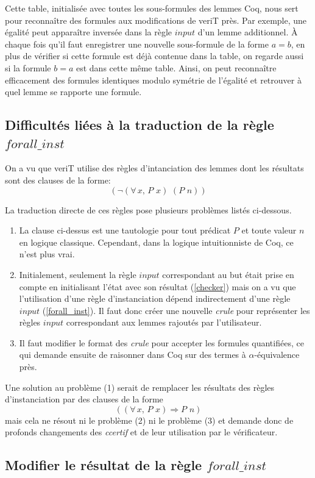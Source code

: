 \documentclass[11pt]{article}
\begin{document}
Cette table, initialisée avec toutes les sous-formules des lemmes Coq, nous sert pour reconnaître des formules aux modifications de veriT près. Par exemple, une égalité  peut apparaître inversée  dans la règle $input$ d'un lemme additionnel. À chaque fois qu'il faut enregistrer une nouvelle sous-formule de la forme $a = b$, en plus de vérifier si cette formule est déjà contenue dans la table, on regarde aussi si la formule $b = a$ est dans cette même table. Ainsi, on peut reconnaître efficacement des formules identiques modulo symétrie de l'égalité et retrouver à quel lemme se rapporte une formule.

\subsection{Difficultés liées à la traduction de la règle $forall\_inst$}
On a vu que veriT utilise des règles d'intanciation des lemmes dont les résultats sont des clauses de la forme: 
\[  (\neg (\forall \, x, \, P \,\, x) \,\, (P \,\, n)) \]

La traduction directe de ces règles pose plusieurs problèmes listés ci-dessous. 
\begin{enumerate}
\item La clause ci-dessus est une tautologie pour tout prédicat $P$ et toute valeur $n$ en logique classique. Cependant, dans la logique intuitionniste de Coq, ce n'est plus vrai. 
\item Initialement, seulement la règle $input$ correspondant au but était prise en compte en initialisant l'état avec son résultat (\ref{checker}) mais on a vu que l'utilisation d'une règle d'instanciation dépend indirectement d'une règle $input$ (\ref{forall_inst}). Il faut donc créer une nouvelle \textit{crule} pour représenter les règles $input$ correspondant aux lemmes rajoutés par l'utilisateur.
\item Il faut modifier le format des \textit{crule} pour accepter les formules quantifiées, ce qui demande ensuite de raisonner dans Coq sur des termes à $\alpha$-équivalence près.
\end{enumerate}
Une solution au problème (1) serait de remplacer les résultats des règles d'instanciation par des clauses de la forme
\[   ((\forall \, x, \, P\,\, x) \Rightarrow P \,\, n) \]
mais cela ne résout ni le problème (2) ni le problème (3) et demande donc de profonds changements des \textit{ccertif} et de leur utilisation par le vérificateur.


\subsection{Modifier le résultat de la règle $forall\_inst$} \label{processing_forallinst}
\end{document}
